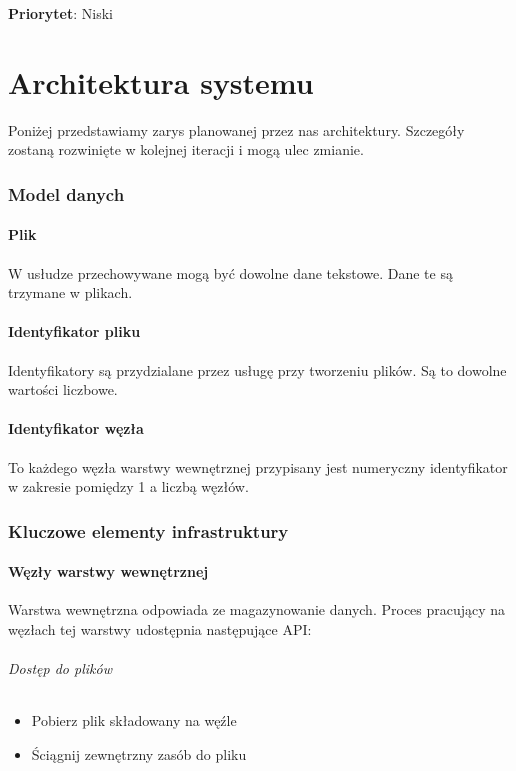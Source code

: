 \documentclass[a4paper,11pt]{article}
\begin{document}
\textbf{Priorytet}: Niski


\part{Architektura systemu}
Poniżej przedstawiamy zarys planowanej przez nas architektury.
Szczegóły zostaną rozwinięte w kolejnej iteracji i mogą ulec zmianie.

\section{Model danych}
\subsection{Plik}
W usłudze przechowywane mogą być dowolne dane tekstowe.  Dane te są
trzymane w plikach.

\subsection{Identyfikator pliku}
Identyfikatory są przydzialane przez usługę przy tworzeniu plików.
Są to dowolne wartości liczbowe.

\subsection{Identyfikator węzła}
To każdego węzła warstwy wewnętrznej przypisany jest numeryczny
identyfikator w zakresie pomiędzy 1 a liczbą węzłów.

\section{Kluczowe elementy infrastruktury}
\subsection{Węzły warstwy wewnętrznej}
Warstwa wewnętrzna odpowiada ze magazynowanie danych.  Proces pracujący
na węzłach tej warstwy udostępnia następujące API:
\paragraph{Dostęp do plików}
\begin{itemize}
  \item Pobierz plik składowany na węźle
  \item Ściągnij zewnętrzny zasób do pliku
\end{itemize}
\end{document}
